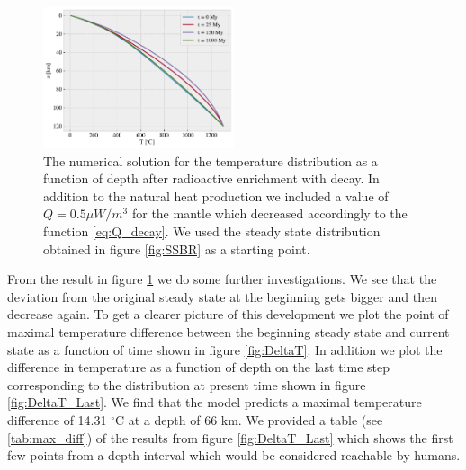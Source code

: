 \documentclass[%
 reprint,
nofootinbib,
aps,
]{revtex4-1}
\begin{document}
\begin{figure}[H]
    \centering
    \includegraphics[width=0.5\textwidth]{figures/SteadyState_AR_decay.pdf}
    \caption{The numerical solution for the temperature distribution as a function of depth after radioactive enrichment with decay. In addition to the natural heat production we included a value of $Q = 0.5 \mu W/m^3$ for the mantle which decreased accordingly to the function \ref{eq:Q_decay}. We used the steady state distribution obtained in figure \ref{fig:SSBR} as a starting point.}
    \label{fig:AF_Q_decay}
\end{figure}


From the result in figure \ref{fig:AF_Q_decay} we do some further investigations. We see that the deviation from the original steady state at the beginning gets bigger and then decrease again. To get a clearer picture of this development we plot the point of maximal temperature difference between the beginning steady state and current state as a function of time shown in figure \ref{fig:DeltaT}. In addition we plot the difference in temperature as a function of depth on the last time step corresponding to the distribution at present time shown in figure \ref{fig:DeltaT_Last}. We find that the model predicts a maximal temperature difference of 14.31 $^{\circ}$C at a depth of 66 km. We provided a table (see \ref{tab:max_diff}) of the results from figure \ref{fig:DeltaT_Last} which shows the first few points from a depth-interval which would be considered reachable by humans.
\end{document}

